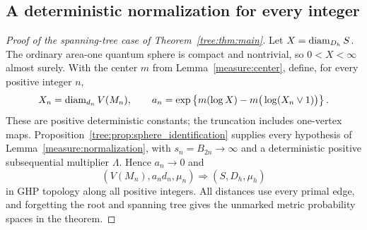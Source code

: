 \subsection{A deterministic normalization for every integer}

\begin{proof}[Proof of the spanning-tree case of Theorem~\ref{tree:thm:main}]
Let $X=\operatorname{diam}_{D_h}S$. The ordinary area-one quantum sphere is compact
and nontrivial, so $0<X<\infty$ almost surely. With the center $m$ from
Lemma~\ref{measure:center}, define, for every positive integer $n$,
\begin{equation}\label{tree:eq:sphere_final_normalization}
 X_n=\operatorname{diam}_{d_n}V(M_n),\qquad
 a_n=\exp\left\{m(\log X)-m\big(\log(X_n\vee1)\big)\right\}.
\end{equation}
These are positive deterministic constants; the truncation includes
one-vertex maps. Proposition~\ref{tree:prop:sphere_identification}
supplies every hypothesis of Lemma~\ref{measure:normalization}, with
$s_n=B_{2n}\to\infty$ and a deterministic positive subsequential
multiplier $\Lambda$. Hence $a_n\to0$ and
\[
 (V(M_n),a_nd_n,\mu_n)\Longrightarrow(S,D_h,\mu_h)
\]
in GHP topology along all positive integers. All distances use every
primal edge, and forgetting the root and spanning tree gives the
unmarked metric probability spaces in the theorem.
\end{proof}
